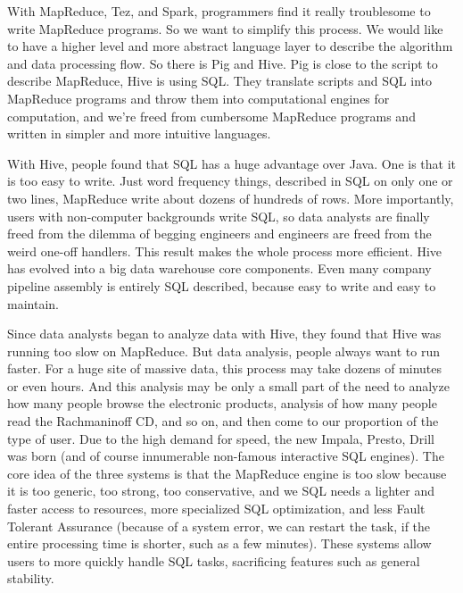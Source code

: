 \documentclass[sigconf]{acmart}
\begin{document}
\par With MapReduce, Tez, and Spark, programmers find it really troublesome to write MapReduce programs. So we want to simplify this process. We would like to have a higher level and more abstract language layer to describe the algorithm and data processing flow.\cite{Zhou2017} So there is Pig and Hive. Pig is close to the script to describe MapReduce, Hive is using SQL. They translate scripts and SQL into MapReduce programs and throw them into computational engines for computation, and we're freed from cumbersome MapReduce programs and written in simpler and more intuitive languages.\cite{Zhou2017}

\par With Hive, people found that SQL has a huge advantage over Java. One is that it is too easy to write. Just word frequency things, described in SQL on only one or two lines, MapReduce write about dozens of hundreds of rows.\cite{Zhou2017} More importantly, users with non-computer backgrounds write SQL, so data analysts are finally freed from the dilemma of begging engineers and engineers are freed from the weird one-off handlers.\cite{Zhou2017} This result makes the whole process more efficient. Hive has evolved into a big data warehouse core components. Even many company pipeline assembly is entirely SQL described, because easy to write and easy to maintain.

\par Since data analysts began to analyze data with Hive, they found that Hive was running too slow on MapReduce. But data analysis, people always want to run faster. For a huge site of massive data, this process may take dozens of minutes or even hours.\cite{Zhou2017} And this analysis may be only a small part of the need to analyze how many people browse the electronic products, analysis of how many people read the Rachmaninoff CD, and so on, and then come to our proportion of the type of user. Due to the high demand for speed, the new Impala, Presto, Drill was born (and of course innumerable non-famous interactive SQL engines). The core idea of the three systems is that the MapReduce engine is too slow because it is too generic, too strong, too conservative, and we SQL needs a lighter and faster access to resources, more specialized SQL optimization, and less Fault Tolerant Assurance (because of a system error, we can restart the task, if the entire processing time is shorter, such as a few minutes). These systems allow users to more quickly handle SQL tasks, sacrificing features such as general stability.
\end{document}
